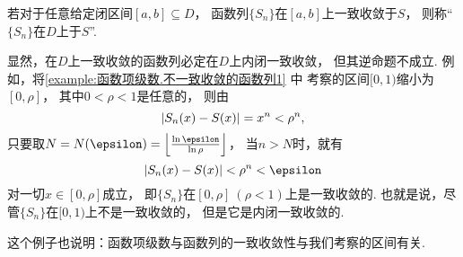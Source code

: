 \begin{definition}
若对于任意给定闭区间\([a,b] \subseteq D\)，
函数列\(\{S_n\}\)在\([a,b]\)上一致收敛于\(S\)，
则称“\(\{S_n\}\)在\(D\)上于\(S\)”.
\end{definition}
显然，在\(D\)上一致收敛的函数列必定在\(D\)上内闭一致收敛，
但其逆命题不成立.
例如，将\cref{example:函数项级数.不一致收敛的函数列1} 中
考察的区间\([0,1)\)缩小为\([0,\rho]\)，
其中\(0<\rho<1\)是任意的，
则由\begin{equation*}
	\abs{S_n(x) - S(x)} = x^n < \rho^n,
\end{equation*}
只要取\(N = N(\epsilon) = \floor*{\frac{\ln\epsilon}{\ln\rho}}\)，
当\(n>N\)时，就有\begin{equation*}
	\abs{S_n(x) - S(x)} < \rho^n < \epsilon
\end{equation*}对一切\(x\in[0,\rho]\)成立，
即\(\{S_n\}\)在\([0,\rho]\ (\rho<1)\)上是一致收敛的.
也就是说，尽管\(\{S_n\}\)在\([0,1)\)上不是一致收敛的，
但是它是内闭一致收敛的.

这个例子也说明：函数项级数与函数列的一致收敛性与我们考察的区间有关.

